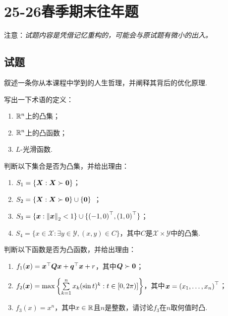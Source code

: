 \chapter{25-26春季期末往年题}

注意：\textit{试题内容是凭借记忆重构的，可能会与原试题有微小的出入。}

\section{试题}

\begin{question}[$5$]
    叙述一条你从本课程中学到的人生哲理，并阐释其背后的优化原理.
\end{question}

\begin{question}[$15 = 3\times 5$]
    写出一下术语的定义：
    \begin{enumerate}
        \item $\mathbb{R}^n$上的凸集；
        \item $\mathbb{R}^n$上的凸函数；
        \item $L$-光滑函数.
    \end{enumerate}
\end{question}

\begin{question}[$12 = 4 \times 3$]
    判断以下集合是否为凸集，并给出理由：
    \begin{enumerate}
        \item $S_1 = \{\boldsymbol{X}: \boldsymbol{X} \succ \boldsymbol{0} \}$；
        \item $S_2 = \{\boldsymbol{X}: \boldsymbol{X} \succ \boldsymbol{0} \} \cup \{\boldsymbol{0}\}$ ；
        \item $S_3 = \{\boldsymbol{x}: \left\lVert\boldsymbol{x}\right\rVert_2 < 1\} \cup \{{(-1,0)}^\top, {(1,0)}^\top\}$；
        \item $S_4 = \{x \in \mathcal{X}: \exists y \in \mathcal{Y}, (x,y) \in C\}$，其中$C$是$\mathcal{X} \times \mathcal{Y}$中的凸集. 
    \end{enumerate}
\end{question}

\begin{question}[$12 = 3 \times 4$]
    判断以下函数是否为凸函数，并给出理由：
    \begin{enumerate}
        \item $f_1(\boldsymbol{x}) = \boldsymbol{x}^\top \boldsymbol{Q} \boldsymbol{x} + \boldsymbol{q}^\top \boldsymbol{x} + r$，其中$\boldsymbol{Q} \succ \boldsymbol{0}$；
        
        \item $f_2(\boldsymbol{x}) = \max
        \left\{
            \sum\limits_{k=1}^n x_k (\sin t)^k: t\in [0, 2\pi) ]
        \right\}$，其中$\boldsymbol{x} = {(x_1, \dots, x_n)}^\top$；

        \item $f_3(x) = x^n$，其中$x\in\mathbb{R}$且$n$是整数，请讨论$f_3$在$n$取何值时凸.
    \end{enumerate}
\end{question}

